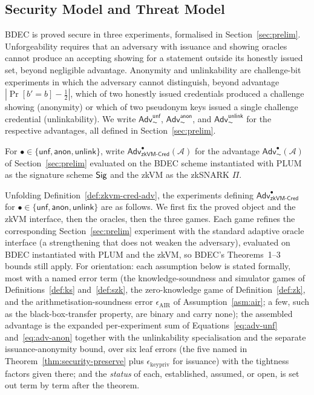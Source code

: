 \subsection{Security Model and Threat Model}\label{ssec:threat-model}
BDEC is proved secure in three experiments, formalised in Section~\ref{sec:prelim}. Unforgeability requires that an adversary with issuance and showing oracles cannot produce an accepting showing for a statement outside its honestly issued set, beyond negligible advantage. Anonymity and unlinkability are challenge-bit experiments in which the adversary cannot distinguish, beyond advantage $|\Pr[b'=b]-\tfrac12|$, which of two honestly issued credentials produced a challenge showing (anonymity) or which of two pseudonym keys issued a single challenge credential (unlinkability). We write $\mathsf{Adv}^{\mathsf{unf}}_{\AC}$, $\mathsf{Adv}^{\mathsf{anon}}_{\AC}$, and $\mathsf{Adv}^{\mathsf{unlink}}_{\AC}$ for the respective advantages, all defined in Section~\ref{sec:prelim}.
\begin{definition}\label{def:zkvm-cred-adv}
    For $\bullet\in\{\mathsf{unf},\mathsf{anon},\mathsf{unlink}\}$, write $\mathsf{Adv}^{\bullet}_{\mathsf{zkVM\text{-}Cred}}(\mathcal A)$ for the advantage $\mathsf{Adv}^{\bullet}_{\AC}(\mathcal A)$ of Section~\ref{sec:prelim} evaluated on the BDEC scheme instantiated with PLUM as the signature scheme $\mathsf{Sig}$ and the zkVM as the zkSNARK $\Pi$.
\end{definition}

Unfolding Definition~\ref{def:zkvm-cred-adv}, the experiments defining $\mathsf{Adv}^{\bullet}_{\mathsf{zkVM\text{-}Cred}}$ for $\bullet\in\{\mathsf{unf},\mathsf{anon},\mathsf{unlink}\}$ are as follows. We first fix the proved object and the zkVM interface, then the oracles, then the three games. Each game refines the corresponding Section~\ref{sec:prelim} experiment with the standard adaptive oracle interface (a strengthening that does not weaken the adversary), evaluated on BDEC instantiated with PLUM and the zkVM, so BDEC's Theorems~1--3 bounds still apply. For orientation: each assumption below is stated formally, most with a named error term (the knowledge-soundness and simulator games of Definitions~\ref{def:ks} and~\ref{def:szk}, the zero-knowledge game of Definition~\ref{def:zk}, and the arithmetisation-soundness error $\epsilon_{\mathrm{AIR}}$ of Assumption~\ref{asm:air}; a few, such as the black-box-transfer property, are binary and carry none); the assembled advantage is the expanded per-experiment sum of Equations~\eqref{eq:adv-unf} and~\eqref{eq:adv-anon} together with the unlinkability specialisation and the separate issuance-anonymity bound, over six leaf errors (the five named in Theorem~\ref{thm:security-preserve} plus $\epsilon_{\mathrm{keypriv}}$ for issuance) with the tightness factors given there; and the \emph{status} of each, established, assumed, or open, is set out term by term after the theorem.

